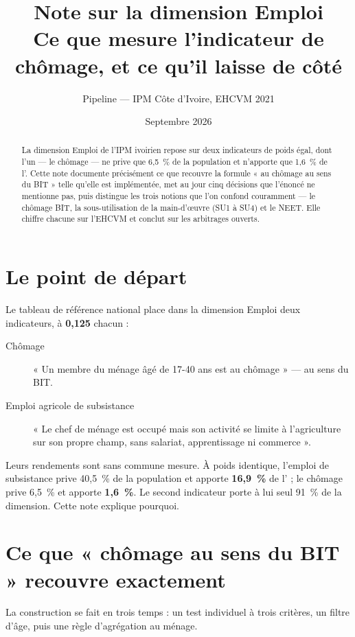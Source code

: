 \documentclass[11pt,a4paper]{article}
\title{\bfseries Note sur la dimension Emploi\\[4pt]
\large Ce que mesure l'indicateur de chômage, et ce qu'il laisse de côté}
\author{Pipeline \col{PythonIPM} --- IPM Côte d'Ivoire, EHCVM 2021}
\date{Septembre 2026}
\begin{document}
\maketitle

\begin{abstract}
\noindent La dimension Emploi de l'IPM ivoirien repose sur deux indicateurs de poids égal, dont
l'un --- le chômage --- ne prive que 6,5~\% de la population et n'apporte que 1,6~\% de l'\ipm{}.
Cette note documente précisément ce que recouvre la formule « au chômage au sens du BIT » telle
qu'elle est implémentée, met au jour cinq décisions que l'énoncé ne mentionne pas, puis distingue
les trois notions que l'on confond couramment --- le chômage BIT, la sous-utilisation de la
main-d'\oe uvre (SU1 à SU4) et le NEET. Elle chiffre chacune sur l'EHCVM et conclut sur les
arbitrages ouverts.
\end{abstract}

\section{Le point de départ}

Le tableau de référence national place dans la dimension Emploi deux indicateurs, à
\textbf{0,125} chacun :

\begin{description}
  \item[Chômage] « Un membre du ménage âgé de 17-40 ans est au chômage » --- au sens du BIT.
  \item[Emploi agricole de subsistance] « Le chef de ménage est occupé mais son activité se
  limite à l'agriculture sur son propre champ, sans salariat, apprentissage ni commerce ».
\end{description}

Leurs rendements sont sans commune mesure. À poids identique, l'emploi de subsistance prive
40,5~\% de la population et apporte \textbf{16,9~\%} de l'\ipm{} ; le chômage prive 6,5~\% et
apporte \textbf{1,6~\%}. Le second indicateur porte à lui seul 91~\% de la dimension. Cette note
explique pourquoi.

\section{Ce que « chômage au sens du BIT » recouvre exactement}

La construction se fait en trois temps : un test individuel à trois critères, un filtre d'âge,
puis une règle d'agrégation au ménage.
\end{document}
